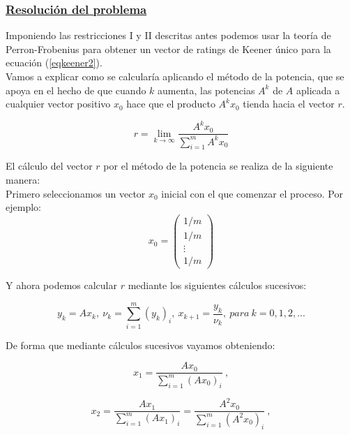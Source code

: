 \subsubsection*{\underline{Resolución del problema}}
Imponiendo las restricciones I y II descritas antes podemos usar la teoría de Perron-Frobenius \cite[pág 36]{cap4} \cite{perron} para obtener un vector de ratings de Keener único para la ecuación (\ref{eqkeener2}).\\

Vamos a explicar como se calcularía aplicando el método de la potencia, que se apoya en el hecho de que cuando $k$ aumenta, las potencias $A^{k}$ de $A$ aplicada a cualquier vector positivo $x_{0}$ hace que el producto $A^{k} x_{0}$ tienda hacia el vector $r$.

\begin{equation}
r = \lim\limits_{k \rightarrow \infty}\dfrac{A^{k} x_{0}}{\sum_{i=1}^{m}A^{k} x_{0}} 
\end{equation}
 
El cálculo del vector $r$ por el método de la potencia se realiza de la siguiente manera:\\

Primero seleccionamos un vector $x_{0}$ inicial con el que comenzar el proceso. Por ejemplo:\\
\begin{equation*}
x_{0} = 
\left( \begin{array}{c}
1/m\\
1/m\\
\vdots\\
1/m
\end{array}\right) 
\end{equation*}
 
Y ahora podemos calcular $r$ mediante los siguientes cálculos sucesivos:

\begin{equation}
y_{k}=Ax_{k}, \ \nu_{k}=\sum_{i=1}^{m}(y_{k})_{i}, \ x_{k+1}=\dfrac{y_{k}}{\nu_{k}}, \ para \ k = 0,1,2,... \label{powerm}
\end{equation}
 
De forma que mediante cálculos sucesivos vayamos obteniendo:

\begin{equation*}
x_{1}=\dfrac{Ax_{0}}{\sum_{i=1}^{m}(Ax_{0})_{i}} \ ,
\end{equation*}

\begin{equation*}
x_{2}=\dfrac{Ax_{1}}{\sum_{i=1}^{m}(Ax_{1})_{i}} = \dfrac{A^{2}x_{0}}{\sum_{i=1}^{m}(A^{2}x_{0})_{i}} \ ,
\end{equation*}

